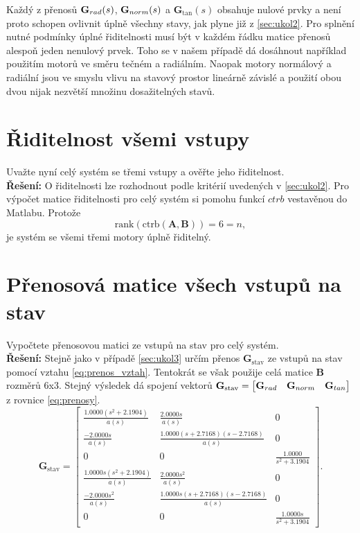\documentclass[twoside]{article}
\begin{document}
Každý z přenosů $\mathbf{G}_{rad}(s)$, $\mathbf{G}_{norm}(s)$ a $\mathbf{G}_\tan(s)$ obsahuje nulové prvky a není proto schopen ovlivnit 
úplně všechny stavy, jak plyne již z \ref{sec:ukol2}. Pro splnění nutné podmínky úplné řiditelnosti musí být v 
každém řádku matice přenosů alespoň jeden nenulový prvek. Toho se v našem případě dá dosáhnout
například použitím motorů ve směru tečném a radiálním. Naopak motory normálový a radiální jsou ve smyslu vlivu na
stavový prostor lineárně závislé a použití obou dvou nijak nezvětší množinu dosažitelných stavů.

\section{Řiditelnost všemi vstupy}
\label{sec:ukol4}
Uvažte nyní celý systém se třemi vstupy a ověřte jeho řiditelnost. \\
\textbf{Řešení:}
O řiditelnosti lze rozhodnout podle kritérií uvedených v \ref{sec:ukol2}.
Pro výpočet  matice řiditelnosti pro celý systém si pomohu funkcí $ctrb$ vestavěnou do Matlabu. Protože
\begin{equation*}
	\text{rank}(\text{ctrb}(\mathbf{A}, \mathbf{B})) = 6 = n,
\end{equation*}
je systém se všemi třemi motory úplně řiditelný.

\section{Přenosová matice všech vstupů na stav}
\label{sec:ukol5}
Vypočtete přenosovou matici ze vstupů na stav pro celý systém.\\
\textbf{Řešení:}
Stejně jako v případě \ref{sec:ukol3} určím přenos $\mathbf{G}_{\text{stav}}$ ze vstupů na stav pomocí vztahu \eqref{eq:prenos_vztah}.
Tentokrát se však použije celá matice $\mathbf{B}$ rozměrů 6x3. Stejný výsledek dá spojení vektorů $\mathbf{G}_{\text{stav}} = 
\begin{bmatrix} \mathbf{G}_{rad} & \mathbf{G}_{norm} & \mathbf{G}_{tan} \end{bmatrix}$ z rovnice \eqref{eq:prenosy}.
\begin{equation*}
	\mathbf{G}_\text{stav} = \begin{bmatrix}
	\frac{1.0000(s^2+2.1904)     }{a(s)} 	&\frac{2.0000s}{a(s)}                     & 0                             \\
	\frac{-2.0000s        }{a(s)}        	&\frac{1.0000(s+2.7168)(s-2.7168) }{a(s)} & 0                             \\
	0                                    	&0                                        & \frac{1.0000}{s^2+3.1904}     \\
	\frac{1.0000s(s^2+2.1904)}{a(s)}     	&\frac{2.0000s^2                  }{a(s)} & 0                             \\
	\frac{-2.0000s^2}{a(s)}              	&\frac{1.0000s(s+2.7168)(s-2.7168)}{a(s)} & 0                             \\
	0                                    	&0                                        & \frac{1.0000s}{s^2+3.1904}    
	\end{bmatrix}.
\end{equation*}
\end{document}
